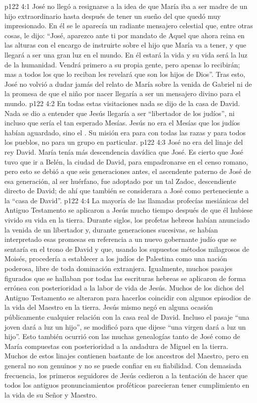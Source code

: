\vs p122 4:1 José no llegó a resignarse a la idea de que María iba a ser madre de un hijo extraordinario hasta después de tener un sueño del que quedó muy impresionado. En él se le aparecía un radiante mensajero celestial que, entre otras cosas, le dijo: “José, aparezco ante ti por mandato de Aquel que ahora reina en las alturas con el encargo de instruirte sobre el hijo que María va a tener, y que llegará a ser una gran luz en el mundo. En él estará la vida y su vida será la luz de la humanidad. Vendrá primero a su propia gente, pero apenas lo recibirán; mas a todos los que lo reciban les revelará que son los hijos de Dios”. Tras esto, José no volvió a dudar jamás del relato de María sobre la venida de Gabriel ni de la promesa de que el niño por nacer llegaría a ser un mensajero divino para el mundo.
\vs p122 4:2 \pc En todas estas visitaciones nada se dijo de la casa de David. Nada se dio a entender que Jesús llegaría a ser “libertador de los judíos”, ni incluso que sería el tan esperado Mesías. Jesús no era el Mesías que los judíos habían aguardado, sino el . Su misión era para con todas las razas y para todos los pueblos, no para un grupo en particular.
\vs p122 4:3 José no era del linaje del rey David. María tenía más descendencia davídica que José. Es cierto que José tuvo que ir a Belén, la ciudad de David, para empadronarse en el censo romano, pero esto se debió a que seis generaciones antes, el ascendente paterno de José de esa generación, al ser huérfano, fue adoptado por un tal Zadoc, descendiente directo de David; de ahí que también se considerara a José como perteneciente a la “casa de David”.
\vs p122 4:4 La mayoría de las llamadas profecías mesiánicas del Antiguo Testamento se aplicaron a Jesús mucho tiempo después de que él hubiese vivido su vida en la tierra. Durante siglos, los profetas hebreos habían anunciado la venida de un libertador y, durante generaciones sucesivas, se habían interpretado esas promesas en referencia a un nuevo gobernante judío que se sentaría en el trono de David y que, usando los supuestos métodos milagrosos de Moisés, procedería a establecer a los judíos de Palestina como una nación poderosa, libre de toda dominación extranjera. Igualmente, muchos pasajes figurados que se hallaban por todas las escrituras hebreas se aplicaron de forma errónea con posterioridad a la labor de vida de Jesús. Muchos de los dichos del Antiguo Testamento se alteraron para hacerlos coincidir con algunos episodios de la vida del Maestro en la tierra. Jesús mismo negó en alguna ocasión públicamente cualquier relación con la casa real de David. Incluso el pasaje “una joven dará a luz un hijo”, se modificó para que dijese “una virgen dará a luz un hijo”. Esto también ocurrió con las muchas genealogías tanto de José como de María compuestas con posterioridad a la andadura de Miguel en la tierra. Muchos de estos linajes contienen bastante de los ancestros del Maestro, pero en general no son genuinos y no se puede confiar en su fiabilidad. Con demasiada frecuencia, los primeros seguidores de Jesús cedieron a la tentación de hacer que todos los antiguos pronunciamientos proféticos parecieran tener cumplimiento en la vida de su Señor y Maestro.
